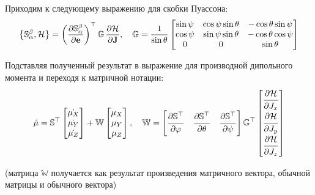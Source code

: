 \documentclass[12pt]{article}
\newcommand{\bbG}{\mathbb{G}}
\newcommand{\bbS}{\mathbb{S}}
\newcommand{\bfJ}{\mathbf{J}}
\newcommand{\mH}{\mathcal{H}}
\newcommand{\lb}{\left(}
\newcommand{\rb}{\right)}
\newcommand{\lcb}{\left\{}
\newcommand{\rcb}{\right\}}
\begin{document}
Приходим к следующему выражению для скобки Пуассона:
\begin{gather}
	\lcb \bbS_\alpha^\beta, \mH \rcb = \lb \frac{\partial \bbS_\alpha^\beta}{\partial \mathbf{e}} \rb^\top \bbG \, \frac{\partial \mH}{\partial \bfJ}, \quad \bbG = \frac{1}{\sin \theta}
\begin{bmatrix}
	\sin \psi & \cos \psi \sin \theta & -\cos \theta \sin \psi \\
	\cos \psi & \sin \psi \sin \theta & - \cos \theta \cos \psi \\
	0 & 0 & \sin \theta
\end{bmatrix} \notag
\end{gather}

Подставляя полученный результат в выражение для производной дипольного момента и переходя к матричной нотации:
\begin{gather}
	\dot{\mu} = \bbS^\top
	\begin{bmatrix}
		\dot{\mu_X} \\
		\dot{\mu_Y} \\
		\dot{\mu_Z}
	\end{bmatrix} +
        \mathbb{W}
	\begin{bmatrix}
		\mu_X \\
		\mu_Y \\
		\mu_Z
	\end{bmatrix}, 
	\quad 
	\mathbb{W} = 
	\begin{bmatrix}
		\dfrac{\strut\partial \bbS^\top}{\strut\partial \varphi} &
		\dfrac{\strut\partial \bbS^\top}{\strut\partial \theta} &
		\dfrac{\strut\partial \bbS^\top}{\strut\partial \psi}
	\end{bmatrix}
	\bbG^\top
	\begin{bmatrix}
		\dfrac{\strut\partial \mH}{\strut\partial J_x} \\
		\dfrac{\strut\partial \mH}{\strut\partial J_y} \\
		\dfrac{\strut\partial \mH}{\strut\partial J_z}
	\end{bmatrix} \notag
\end{gather}

(матрица $\mathbb{W}$ получается как результат произведения матричного вектора, обычной матрицы и обычного вектора)
\end{document}
